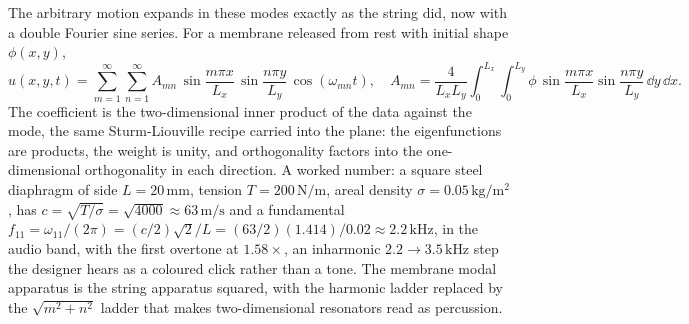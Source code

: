 The arbitrary motion expands in these modes exactly as the string
did, now with a double Fourier sine series. For a membrane released
from rest with initial shape $\phi(x, y)$,
\[
u(x, y, t) = \sum_{m=1}^{\infty}\sum_{n=1}^{\infty}
   A_{mn}\,\sin\!\frac{m\pi x}{L_{x}}\,\sin\!\frac{n\pi y}{L_{y}}\,
   \cos(\omega_{mn}t),
\quad
A_{mn} = \frac{4}{L_{x}L_{y}}\!\int_{0}^{L_{x}}\!\!\int_{0}^{L_{y}}
   \phi\,\sin\!\frac{m\pi x}{L_{x}}\sin\!\frac{n\pi y}{L_{y}}\,\dd y\,\dd x.
\]
The coefficient is the two-dimensional inner product of the data
against the mode, the same Sturm-Liouville recipe carried into the
plane: the eigenfunctions are products, the weight is unity, and
orthogonality factors into the one-dimensional orthogonality in each
direction. A worked number: a square steel diaphragm of side $L =
20\,\si{\milli\meter}$, tension $T = 200\,\si{\newton\per\meter}$,
areal density $\sigma = 0.05\,\si{\kilogram\per\meter\squared}$, has
$c = \sqrt{T/\sigma} = \sqrt{4000} \approx 63\,\si{\meter\per\second}$
and a fundamental $f_{11} = \omega_{11}/(2\pi) = (c/2)\sqrt{2}/L =
(63/2)(1.414)/0.02 \approx 2.2\,\si{\kilo\hertz}$, in the audio band,
with the first overtone at $1.58\times$, an inharmonic $2.2 \to
3.5\,\si{\kilo\hertz}$ step the designer hears as a coloured click
rather than a tone. The membrane modal apparatus is the string
apparatus squared, with the harmonic ladder replaced by the
$\sqrt{m^{2}+n^{2}}$ ladder that makes two-dimensional resonators
read as percussion.

